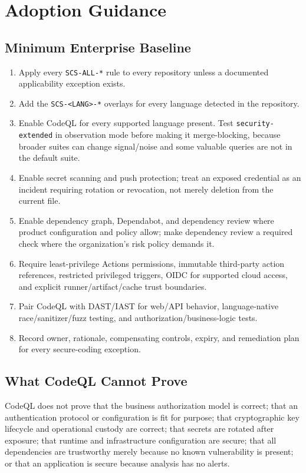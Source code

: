 \documentclass[10pt,letterpaper]{article}
\newcommand{\code}[1]{\texttt{\small #1}}
\begin{document}
\section{Adoption Guidance}
\subsection{Minimum Enterprise Baseline}
\begin{enumerate}[leftmargin=*,itemsep=3pt]
  \item Apply every \code{SCS-ALL-*} rule to every repository unless a documented applicability exception exists.
  \item Add the \code{SCS-<LANG>-*} overlays for every language detected in the repository.
  \item Enable CodeQL for every supported language present. Test \code{security-extended} in observation mode before making it merge-blocking, because broader suites can change signal/noise and some valuable queries are not in the default suite.
  \item Enable secret scanning and push protection; treat an exposed credential as an incident requiring rotation or revocation, not merely deletion from the current file.
  \item Enable dependency graph, Dependabot, and dependency review where product configuration and policy allow; make dependency review a required check where the organization's risk policy demands it.
  \item Require least-privilege Actions permissions, immutable third-party action references, restricted privileged triggers, OIDC for supported cloud access, and explicit runner/artifact/cache trust boundaries.
  \item Pair CodeQL with DAST/IAST for web/API behavior, language-native race/sanitizer/fuzz testing, and authorization/business-logic tests.
  \item Record owner, rationale, compensating controls, expiry, and remediation plan for every secure-coding exception.
\end{enumerate}

\subsection{What CodeQL Cannot Prove}
CodeQL does not prove that the business authorization model is correct; that an authentication protocol or configuration is fit for purpose; that cryptographic key lifecycle and operational custody are correct; that secrets are rotated after exposure; that runtime and infrastructure configuration are secure; that all dependencies are trustworthy merely because no known vulnerability is present; or that an application is secure because analysis has no alerts.
\end{document}
